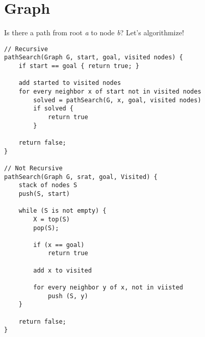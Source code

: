 \documentclass{article}
\begin{document}
\section{Graph}
Is there a path from root \textit{a} to node \textit{b}? Let's algorithmize!

\begin{verbatim}
// Recursive
pathSearch(Graph G, start, goal, visited nodes) {
    if start == goal { return true; }

    add started to visited nodes
    for every neighbor x of start not in visited nodes
        solved = pathSearch(G, x, goal, visited nodes)
        if solved {
            return true
        }

    return false;
}

// Not Recursive
pathSearch(Graph G, srat, goal, Visited) {
    stack of nodes S
    push(S, start)

    while (S is not empty) {
        X = top(S)
        pop(S);

        if (x == goal)
            return true

        add x to visited

        for every neighbor y of x, not in viisted
            push (S, y)
    }

    return false;
}
\end{verbatim}
\end{document}
